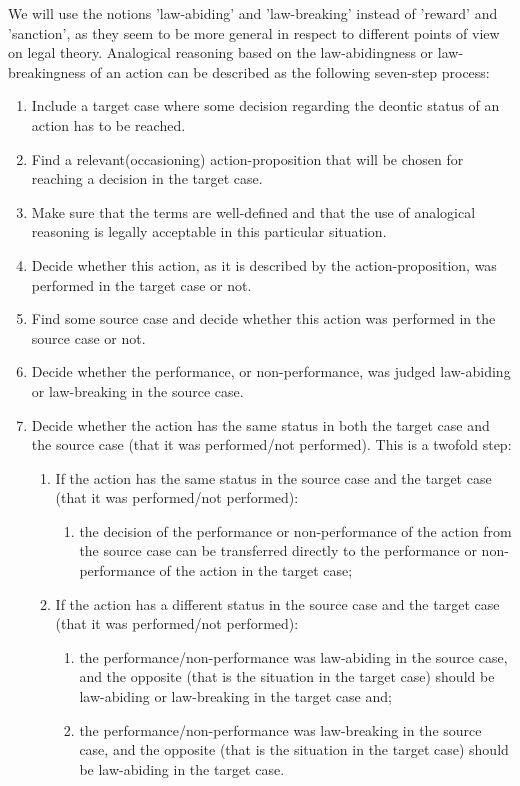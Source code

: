 		We will use the notions 'law-abiding' and 'law-breaking' instead of 'reward' and 'sanction', as they seem to be more general in respect to different points of view on legal theory. Analogical reasoning based on the law-abidingness or law-breakingness of an action can be described as the following seven-step process:
		\begin{enumerate}
			\item Include a target case where some decision regarding the deontic status of an action has to be reached.
			\item Find a relevant(occasioning) action-proposition that will be chosen for reaching a decision in the target case.
			\item Make sure that the terms are well-defined and that the use of analogical reasoning is legally acceptable in this particular situation. 
			\item Decide whether this action, as it is described by the action-proposition, was performed in the target case or not.
			\item Find some source case and decide whether this action was performed in the source case or not.
			\item Decide whether the performance, or non-performance, was judged law-abiding or law-breaking in the source case.
			\item Decide whether the action has the same status in both the target case and the source case (that it was performed/not performed). This is a twofold step:
				\begin{enumerate}
					\item If the action has the same status in the source case and the target case (that it was performed/not performed):
						\begin{enumerate}
							\item the decision of the performance or non-performance of the action from the source case can be transferred directly to the performance or non-performance of the action in the target case;
						\end{enumerate}
					\item If the action has a different status in the source case and the target case (that it was performed/not performed):
						\begin{enumerate}
							\item the performance/non-performance was law-abiding in the source case, and the opposite (that is the situation in the target case) should be law-abiding or law-breaking in the target case and;
							\item the performance/non-performance was law-breaking in the source case, and the opposite (that is the situation in the target case) should be law-abiding in the target case.
						\end{enumerate}
						
				\end{enumerate}	
				
		\end{enumerate}


